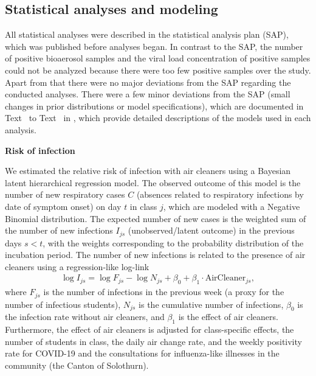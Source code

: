\documentclass[fleqn,11pt]{wlscirep}
\begin{document}
\subsection{Statistical analyses and modeling}

All statistical analyses were described in the statistical analysis plan (SAP)\cite{Banholzer2023SAP}, which was published before analyses began. In contrast to the SAP, the number of positive bioaerosol samples and the viral load concentration of positive samples could not be analyzed because there were too few positive samples over the study. Apart from that there were no major deviations from the SAP regarding the conducted analyses. There were a few minor deviations from the SAP (\eg small changes in prior distributions or model specifications), which are documented in Text~ to Text~ in \supp, which provide detailed descriptions of the models used in each analysis.

\noindent\textbf{Risk of infection} \smallskip

\noindent We estimated the relative risk of infection with air cleaners using a Bayesian latent hierarchical regression model. The observed outcome of this model is the number of new respiratory cases $C$ (absences related to respiratory infections by date of symptom onset) on day $t$ in class $j$, which are modeled with a Negative Binomial distribution. The expected number of new cases is the weighted sum of the number of new infections $I_{js}$ (unobserved/latent outcome) in the previous days $s<t$, with the weights corresponding to the probability distribution of the incubation period. The number of new infections is related to the presence of air cleaners using a regression-like log-link
\begin{align}
    \log I_{js} = \log F_{js} - \log N_{js} + \beta_0 + \beta_1 \cdot \text{AirCleaner}_{js},
\end{align}
where $F_{js}$ is the number of infections in the previous week (a proxy for the number of infectious students), $N_{js}$ is the cumulative number of infections, $\beta_0$ is the infection rate without air cleaners, and $\beta_1$ is the effect of air cleaners. Furthermore, the effect of air cleaners is adjusted for class-specific effects, the number of students in class, the daily air change rate, and the weekly positivity rate for COVID-19 and the consultations for influenza-like illnesses in the community (\ie the Canton of Solothurn).
\end{document}
